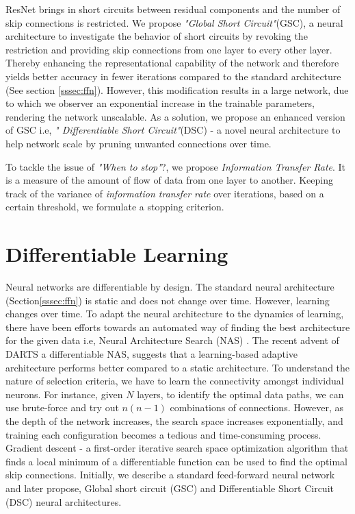 \documentclass{article}
\begin{document}
ResNet brings in short circuits between residual components and the number of skip connections is restricted. We propose \emph{"Global Short Circuit"}(GSC), a neural architecture to investigate the behavior of short circuits by revoking the restriction and providing skip connections from one layer to every other layer. Thereby enhancing the representational capability of the network and therefore yields better accuracy in fewer iterations compared to the standard architecture (See section \ref{sssec:ffn}). However, this modification results in a large network, due to which we observer an exponential increase in the trainable parameters, rendering the network unscalable. As a solution, we propose an enhanced version of GSC i.e, \emph{" Differentiable Short Circuit"}(DSC) - a novel neural architecture to help network scale by pruning unwanted connections over time.

To tackle the issue of \emph{"When to stop"}?, we propose \emph{Information Transfer Rate}. It is a measure of the amount of flow of data from one layer to another. Keeping track of the variance of \emph{information transfer rate} over iterations, based on a certain threshold,  we formulate a stopping criterion.

\section{Differentiable Learning}
\label{sec:headings}

Neural networks are differentiable by design. The standard neural architecture (Section\ref{sssec:ffn}) is static and does not change over time. However, learning changes over time. To adapt the neural architecture to the dynamics of learning, there have been efforts towards an automated way of finding the best architecture for the given data i.e, Neural Architecture Search (NAS) \cite{Zoph2016NeuralAS}. The recent advent of DARTS \cite{Liu2019DARTSDA} a differentiable NAS, suggests that a learning-based adaptive architecture performs better compared to a static architecture. To understand the nature of selection criteria, we have to learn the connectivity amongst individual neurons. For instance, given $N$ layers, to identify the optimal data paths, we can use brute-force and try out $n(n-1)$ combinations of connections. However, as the depth of the network increases, the search space increases exponentially, and training each configuration becomes a tedious and time-consuming process. Gradient descent \cite{ruder2016overview} - a first-order iterative search space optimization algorithm that finds a local minimum of a differentiable function can be used to find the optimal skip connections. Initially, we describe a standard feed-forward neural network and later propose, Global short circuit (GSC) and Differentiable Short Circuit (DSC) neural architectures.
\end{document}
